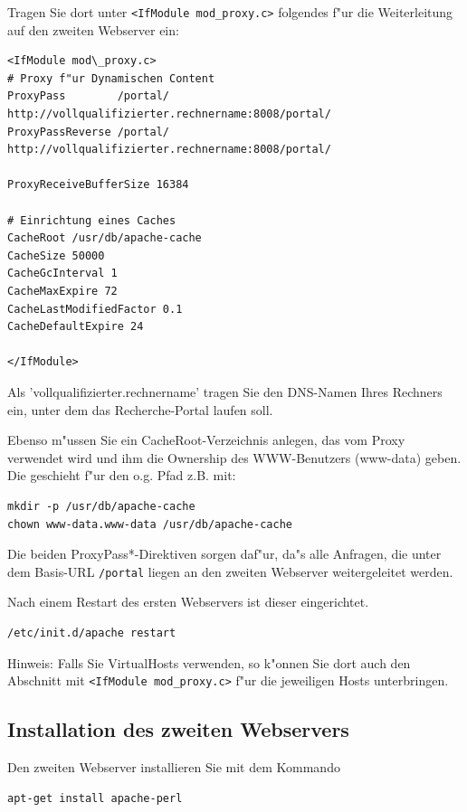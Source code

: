 \documentclass[11pt, twoside, a4paper, BCOR8mm, DIV12, bibtotoc,idxtotoc]{scrbook}
\begin{document}
Tragen Sie dort unter \texttt{<IfModule mod\_proxy.c>} folgendes f"ur die
Weiterleitung auf den zweiten Webserver ein:

\begin{verbatim}
<IfModule mod\_proxy.c>
# Proxy f"ur Dynamischen Content
ProxyPass        /portal/ http://vollqualifizierter.rechnername:8008/portal/
ProxyPassReverse /portal/ http://vollqualifizierter.rechnername:8008/portal/

ProxyReceiveBufferSize 16384

# Einrichtung eines Caches
CacheRoot /usr/db/apache-cache
CacheSize 50000
CacheGcInterval 1
CacheMaxExpire 72
CacheLastModifiedFactor 0.1
CacheDefaultExpire 24

</IfModule>
\end{verbatim}

Als 'vollqualifizierter.rechnername' tragen Sie den DNS-Namen Ihres
Rechners ein, unter dem das Recherche-Portal laufen soll.

Ebenso m"ussen Sie ein CacheRoot-Verzeichnis anlegen, das vom Proxy
verwendet wird und ihm die Ownership des WWW-Benutzers (www-data)
geben. Die geschieht f"ur den o.g. Pfad z.B. mit:

\begin{verbatim}
mkdir -p /usr/db/apache-cache
chown www-data.www-data /usr/db/apache-cache
\end{verbatim}

Die beiden ProxyPass*-Direktiven sorgen daf"ur, da"s alle Anfragen,
die unter dem Basis-URL \texttt{/portal} liegen an den zweiten Webserver
weitergeleitet werden.

Nach einem Restart des ersten Webservers ist dieser eingerichtet.

\begin{verbatim}
/etc/init.d/apache restart
\end{verbatim}


Hinweis: Falls Sie VirtualHosts verwenden, so k"onnen Sie dort auch
den Abschnitt mit \texttt{<IfModule mod\_proxy.c>} f"ur die jeweiligen Hosts
unterbringen.


\subsection{Installation des zweiten Webservers}

Den zweiten Webserver installieren Sie mit dem Kommando

\begin{verbatim}
apt-get install apache-perl
\end{verbatim}
\end{document}
